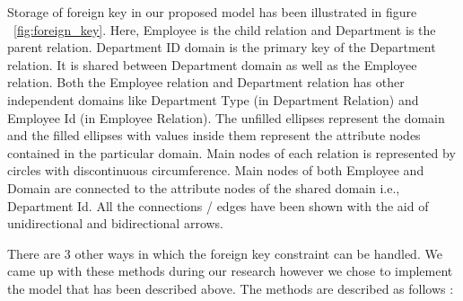 \documentclass[12pt, oneside]{book}
\begin{document}
Storage of foreign key in our proposed model has been illustrated in figure ~\ref{fig:foreign_key}. Here, Employee is the child relation and Department is the parent relation. Department ID domain is the primary key of the Department relation. It is shared between Department domain as well as the Employee relation. Both the Employee relation and Department relation has other independent domains like Department Type (in Department Relation) and Employee Id (in Employee Relation). The unfilled ellipses represent the domain and the filled ellipses with values inside them represent the attribute nodes contained in the particular domain. Main nodes of each relation is represented by circles with discontinuous circumference. Main nodes of both Employee and Domain are connected to the attribute nodes of the shared domain i.e., Department Id. All the connections / edges have been shown with the aid of unidirectional and bidirectional arrows. \\ \par
There are 3 other ways in which the foreign key constraint can be handled. We came up with these methods during our research however we chose to implement the model that has been described above. The methods are described as follows :
\end{document}
